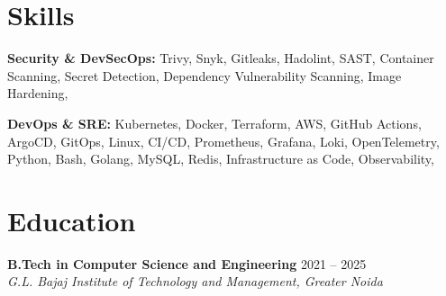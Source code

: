 \documentclass[11pt, letterpaper]{article}
\begin{document}
\section*{Skills}

\vspace{2pt}
\begin{list}{}{%
    \setlength{\leftmargin}{0pt}%
    \setlength{\itemindent}{0pt}%
    \setlength{\labelwidth}{0pt}%
    \setlength{\labelsep}{0pt}%
    \setlength{\topsep}{2pt}%
    \setlength{\itemsep}{2pt}%
    \setlength{\parsep}{0pt}%
}
    \item \textbf{Security \& DevSecOps:} Trivy,\hspace{2pt} Snyk,\hspace{2pt} Gitleaks,\hspace{2pt} Hadolint,\hspace{2pt} SAST,\hspace{2pt} Container Scanning,\hspace{2pt} Secret Detection,\hspace{2pt} Dependency Vulnerability Scanning,\hspace{2pt} Image Hardening,\hspace{2pt}
    \item \textbf{DevOps \& SRE:} Kubernetes,\hspace{2pt} Docker,\hspace{2pt} Terraform,\hspace{2pt} AWS,\hspace{2pt} GitHub Actions,\hspace{2pt} ArgoCD,\hspace{2pt} GitOps,\hspace{2pt} Linux,\hspace{2pt} CI/CD,\hspace{2pt} Prometheus,\hspace{2pt} Grafana,\hspace{2pt} Loki,\hspace{2pt} OpenTelemetry,\hspace{2pt} Python,\hspace{2pt} Bash,\hspace{2pt} Golang,\hspace{2pt} MySQL,\hspace{2pt} Redis,\hspace{2pt} Infrastructure as Code,\hspace{2pt} Observability,\hspace{2pt}
\end{list}

\section*{Education}

\vspace{2pt}
\textbf{B.Tech in Computer Science and Engineering} \hfill 2021 -- 2025 \\
\textit{G.L. Bajaj Institute of Technology and Management, Greater Noida}
\end{document}
